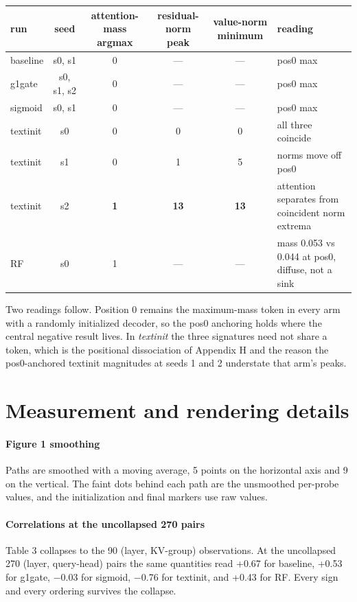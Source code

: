\documentclass{article}
\begin{document}
\begin{table}[t]
  \centering
  \small
  \begin{tabularx}{\linewidth}{lccccX}
    \toprule
    run & seed & attention-mass argmax & residual-norm peak & value-norm minimum & reading \\
    \midrule
    baseline & s0, s1 & 0 & --- & --- & pos0 max \\
    g1gate & s0, s1, s2 & 0 & --- & --- & pos0 max \\
    sigmoid & s0, s1 & 0 & --- & --- & pos0 max \\
    textinit & s0 & 0 & 0 & 0 & all three coincide \\
    textinit & s1 & 0 & 1 & 5 & norms move off pos0 \\
    textinit & s2 & \textbf{1} & \textbf{13} & \textbf{13} & attention separates from coincident norm extrema \\
    RF & s0 & 1 & --- & --- & mass 0.053 vs 0.044 at pos0, diffuse, not a sink \\
    \bottomrule
  \end{tabularx}
\end{table}

Two readings follow. Position 0 remains the maximum-mass token in every arm with a randomly initialized decoder, so the pos0 anchoring holds where the central negative result lives. In \textit{textinit} the three signatures need not share a token, which is the positional dissociation of Appendix H and the reason the pos0-anchored textinit magnitudes at seeds 1 and 2 understate that arm's peaks.

\section{Measurement and rendering details}

\paragraph{Figure 1 smoothing} Paths are smoothed with a moving average, 5 points on the horizontal axis and 9 on the vertical. The faint dots behind each path are the unsmoothed per-probe values, and the initialization and final markers use raw values.

\paragraph{Correlations at the uncollapsed 270 pairs} Table 3 collapses to the 90 (layer, KV-group) observations. At the uncollapsed 270 (layer, query-head) pairs the same quantities read +0.67 for baseline, +0.53 for g1gate, $-$0.03 for sigmoid, $-$0.76 for textinit, and +0.43 for RF. Every sign and every ordering survives the collapse.
\end{document}
